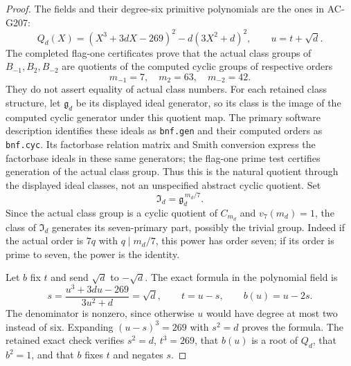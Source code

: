 \begin{proof}
The fields and their degree-six primitive polynomials are
the ones in AC-G207:
\[
 Q_d(X)=(X^3+3dX-269)^2-d(3X^2+d)^2,
                  \qquad u=t+\sqrt d.
 \tag{MQ7.6}
\]
The completed flag-one certificates prove that the actual
class groups of $B_{-1},B_2,B_{-2}$ are quotients of the
computed cyclic groups of respective orders
\[
                         m_{-1}=7,\quad m_2=63,\quad m_{-2}=42.
 \tag{MQ7.7}
\]
They do not assert equality of actual class numbers.
For each retained class structure, let $\mathfrak g_d$ be
its displayed ideal generator, so its class is the image of
the computed cyclic generator under this quotient map.
The primary software description identifies these ideals as
\texttt{bnf.gen} and their computed orders as \texttt{bnf.cyc}.
Its factorbase relation matrix and Smith conversion express
the factorbase ideals in these same generators; the flag-one
prime test certifies generation of the actual class group.
Thus this is the natural quotient through the displayed
ideal classes, not an unspecified abstract cyclic quotient.
Set
\[
                     \mathfrak I_d=\mathfrak g_d^{\,m_d/7}.
 \tag{MQ7.8}
\]
Since the actual class group is a cyclic quotient of $C_{m_d}$
and $v_7(m_d)=1$, the class of $\mathfrak I_d$ generates its
seven-primary part, possibly the trivial group.  Indeed if
the actual order is $7q$ with $q\mid m_d/7$, this power has
order seven; if its order is prime to seven, the power is
the identity.

Let $b$ fix $t$ and send $\sqrt d$ to $-\sqrt d$.
The exact formula in the polynomial field is
\[
 s=\frac{u^3+3du-269}{3u^2+d}=\sqrt d,
           \qquad t=u-s,\qquad b(u)=u-2s.
 \tag{MQ7.9}
\]
The denominator is nonzero, since otherwise $u$ would have
degree at most two instead of six.  Expanding $(u-s)^3=269$
with $s^2=d$ proves the formula.  The retained exact check
verifies $s^2=d$, $t^3=269$, that $b(u)$ is a root of $Q_d$,
that $b^2=1$, and that $b$ fixes $t$ and negates $s$.


\end{proof}
